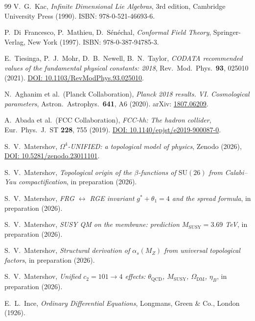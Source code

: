 \documentclass[11pt,a4paper]{article}
\newcommand{\SU}{\ensuremath{\mathrm{SU}}}
\theoremstyle{definition}
\begin{document}
\begin{thebibliography}{99}
V.~G.~Kac,
\textit{Infinite Dimensional Lie Algebras},
3rd edition, Cambridge University Press (1990).
ISBN: 978-0-521-46693-6.

P.~Di~Francesco, P.~Mathieu, D.~S\'en\'echal,
\textit{Conformal Field Theory},
Springer-Verlag, New York (1997).
ISBN: 978-0-387-94785-3.

E.~Tiesinga, P.~J.~Mohr, D.~B.~Newell, B.~N.~Taylor,
\textit{CODATA recommended values of the fundamental physical constants: 2018},
Rev.\ Mod.\ Phys.\ \textbf{93}, 025010 (2021).
\href{https://doi.org/10.1103/RevModPhys.93.025010}{DOI: 10.1103/RevModPhys.93.025010}.

N.~Aghanim et al.\ (Planck Collaboration),
\textit{Planck 2018 results. VI. Cosmological parameters},
Astron.\ Astrophys.\ \textbf{641}, A6 (2020).
arXiv: \href{https://arxiv.org/abs/1807.06209}{1807.06209}.

A.~Abada et al.\ (FCC Collaboration),
\textit{FCC-hh: The hadron collider},
Eur.\ Phys.\ J.\ ST \textbf{228}, 755 (2019).
\href{https://doi.org/10.1140/epjst/e2019-900087-0}{DOI: 10.1140/epjst/e2019-900087-0}.

S.~V.~Matershov,
\textit{$\Omega^4$-UNIFIED: a topological model of physics},
Zenodo (2026),
\href{https://doi.org/10.5281/zenodo.23011101}{DOI: 10.5281/zenodo.23011101}.

S.~V.~Matershov,
\textit{Topological origin of the $\beta$-functions of $\SU(26)$ from Calabi--Yau compactification},
in preparation (2026).

S.~V.~Matershov,
\textit{FRG $\leftrightarrow$ RGE invariant $g^* + \theta_1 = 4$ and the spread formula},
in preparation (2026).

S.~V.~Matershov,
\textit{SUSY QM on the membrane: prediction $M_{\text{SUSY}} = 3.69$ TeV},
in preparation (2026).

S.~V.~Matershov,
\textit{Structural derivation of $\alpha_s(M_Z)$ from universal
topological factors},
in preparation (2026).

S.~V.~Matershov,
\textit{Unified $c_2 = 101 \to 4$ effects:
$\theta_{\text{QCD}}$, $M_{\text{SUSY}}$, $\Omega_{\text{DM}}$, $\eta_B$},
in preparation (2026).        

E.~L.~Ince,
\textit{Ordinary Differential Equations},
Longmans, Green \& Co., London (1926).


\end{thebibliography}
\end{document}
